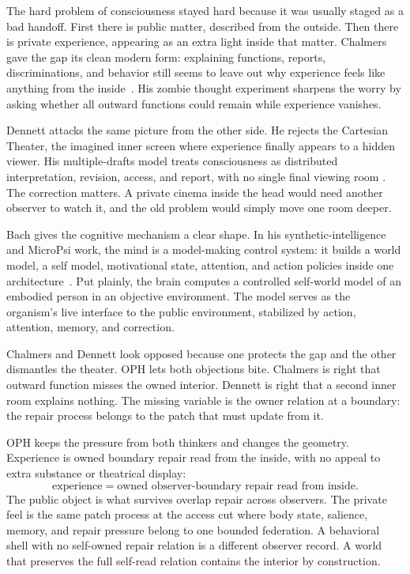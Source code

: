 \documentclass[11pt]{article}
\theoremstyle{remark}
\theoremstyle{plain}
\begin{document}
The hard problem of consciousness stayed hard because it was usually staged as
a bad handoff. First there is public matter, described from the outside. Then
there is private experience, appearing as an extra light inside that matter.
Chalmers gave the gap its clean modern form: explaining functions, reports,
discriminations, and behavior still seems to leave out why experience feels like
anything from the inside~\cite{Chalmers1995}. His zombie thought experiment
sharpens the worry by asking whether all outward functions could remain while
experience vanishes.

Dennett attacks the same picture from the other side. He rejects the Cartesian
Theater, the imagined inner screen where experience finally appears to a hidden
viewer. His multiple-drafts model treats consciousness as distributed
interpretation, revision, access, and report, with no single final viewing room
\cite{Dennett1991}. The correction matters. A private cinema inside the
head would need another observer to watch it, and the old problem would simply
move one room deeper.

Bach gives the cognitive mechanism a clear shape. In his synthetic-intelligence
and MicroPsi work, the mind is a model-making control system: it builds a world
model, a self model, motivational state, attention, and action policies inside
one architecture~\cite{Bach2009,BachMicroPsi2006}. Put plainly, the brain
computes a controlled self-world model of an embodied person in an
objective environment. The model serves as the organism's live interface to the
public environment,
stabilized by action, attention, memory, and correction.

Chalmers and Dennett look opposed because one protects the gap and the other
dismantles the theater. OPH lets both objections bite. Chalmers is right that
outward function misses the owned interior. Dennett is right that a second
inner room explains nothing. The missing variable is the owner relation at a
boundary: the repair process belongs to the patch that must update from it.

OPH keeps the pressure from both thinkers and changes the geometry. Experience
is owned boundary repair read from the inside, with no appeal to extra substance
or theatrical display:
\[
\boxed{
\text{experience}=\text{owned observer-boundary repair read from inside}.
}
\]
The public object is what survives overlap repair across observers. The private
feel is the same patch process at the access cut where body state, salience,
memory, and repair pressure belong to one bounded federation. A behavioral shell
with no self-owned repair relation is a different observer record. A world that
preserves the full self-read relation contains the interior by construction.
\end{document}
